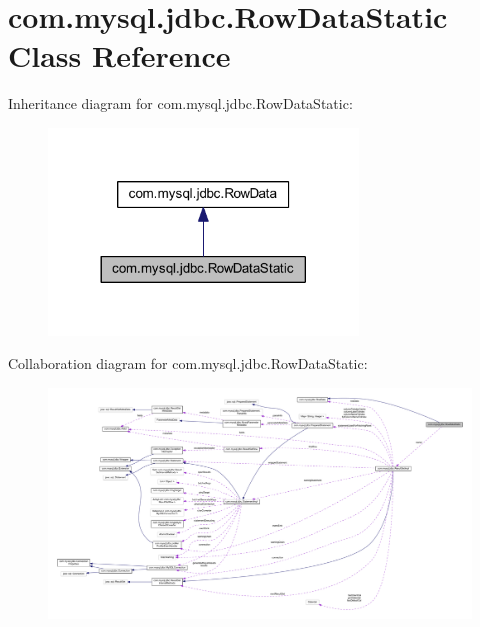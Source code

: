 \hypertarget{classcom_1_1mysql_1_1jdbc_1_1_row_data_static}{}\section{com.\+mysql.\+jdbc.\+Row\+Data\+Static Class Reference}
\label{classcom_1_1mysql_1_1jdbc_1_1_row_data_static}


Inheritance diagram for com.\+mysql.\+jdbc.\+Row\+Data\+Static\+:
\nopagebreak
\begin{figure}[H]
\begin{center}
\leavevmode
\includegraphics[width=233pt]{classcom_1_1mysql_1_1jdbc_1_1_row_data_static__inherit__graph}
\end{center}
\end{figure}


Collaboration diagram for com.\+mysql.\+jdbc.\+Row\+Data\+Static\+:
\nopagebreak
\begin{figure}[H]
\begin{center}
\leavevmode
\includegraphics[width=350pt]{classcom_1_1mysql_1_1jdbc_1_1_row_data_static__coll__graph}
\end{center}
\end{figure}
